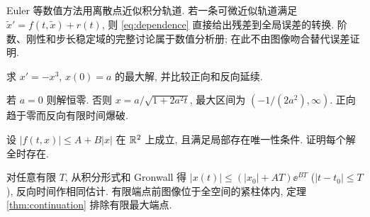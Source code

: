 Euler 等数值方法用离散点近似积分轨道. 若一条可微近似轨道满足 $\widetilde x'=f(t,\widetilde x)+r(t)$, 则 \eqref{eq:dependence} 直接给出残差到全局误差的转换. 阶数、刚性和步长稳定域的完整讨论属于数值分析册; 在此不由图像吻合替代误差证明.
\begin{exercise}求 $x'=-x^3$, $x(0)=a$ 的最大解, 并比较正向和反向延续.\end{exercise}
\begin{solution}若 $a=0$ 则解恒零. 否则 $x=a/\sqrt{1+2a^2t}$, 最大区间为 $(-1/(2a^2),\infty)$. 正向趋于零而反向有限时间爆破.\end{solution}
\begin{exercise}设 $|f(t,x)|\le A+B|x|$ 在 $\mathbb R^2$ 上成立, 且满足局部存在唯一性条件. 证明每个解全时存在.\end{exercise}
\begin{solution}对任意有限 $T$, 从积分形式和 Gronwall 得 $|x(t)|\le(|x_0|+AT)\ee^{BT}$ ($|t-t_0|\le T$), 反向时间作相同估计. 有限端点前图像位于全空间的紧柱体内, 定理 \ref{thm:continuation} 排除有限最大端点.\end{solution}
